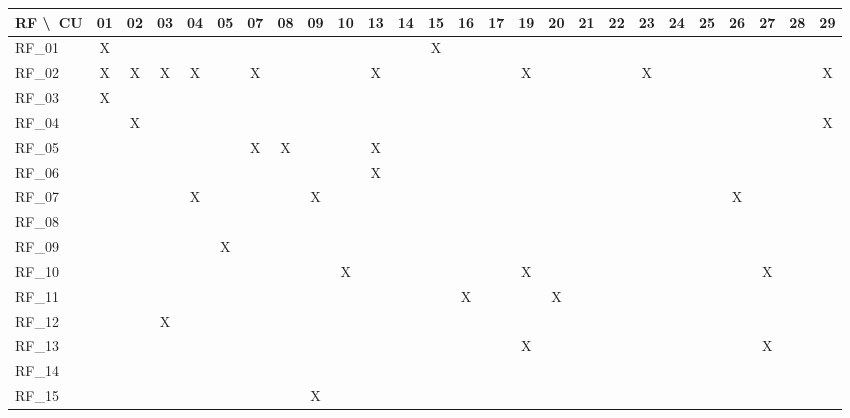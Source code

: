 \begin{landscape}
\scriptsize
\setlength{\tabcolsep}{2pt}
\renewcommand{\arraystretch}{1.1}
\begin{longtable}{|l|*{25}{c|}}
\hline
\textbf{RF \textbackslash\ CU} & \textbf{01} & \textbf{02} & \textbf{03} & \textbf{04} & \textbf{05} & \textbf{07} & \textbf{08} & \textbf{09} & \textbf{10} & \textbf{13} & \textbf{14} & \textbf{15} & \textbf{16} & \textbf{17} & \textbf{19} & \textbf{20} & \textbf{21} & \textbf{22} & \textbf{23} & \textbf{24} & \textbf{25} & \textbf{26} & \textbf{27} & \textbf{28} & \textbf{29}\\\hline
RF\_01 & X &  &  &  &  &  &  &  &  &  &  & X &  &  &  &  &  &  &  &  &  &  &  &  &  \\\hline
RF\_02 & X & X & X & X &  & X &  &  &  & X &  &  &  &  & X &  &  &  & X &  &  &  &  &  & X \\\hline
RF\_03 & X &  &  &  &  &  &  &  &  &  &  &  &  &  &  &  &  &  &  &  &  &  &  &  &  \\\hline
RF\_04 &  & X &  &  &  &  &  &  &  &  &  &  &  &  &  &  &  &  &  &  &  &  &  &  & X \\\hline
RF\_05 &  &  &  &  &  & X & X &  &  & X &  &  &  &  &  &  &  &  &  &  &  &  &  &  &  \\\hline
RF\_06 &  &  &  &  &  &  &  &  &  & X &  &  &  &  &  &  &  &  &  &  &  &  &  &  &  \\\hline
RF\_07 &  &  &  & X &  &  &  & X &  &  &  &  &  &  &  &  &  &  &  &  &  & X &  &  &  \\\hline
RF\_08 &  &  &  &  &  &  &  &  &  &  &  &  &  &  &  &  &  &  &  &  &  &  &  &  &  \\\hline
RF\_09 &  &  &  &  & X &  &  &  &  &  &  &  &  &  &  &  &  &  &  &  &  &  &  &  &  \\\hline
RF\_10 &  &  &  &  &  &  &  &  & X &  &  &  &  &  & X &  &  &  &  &  &  &  & X &  &  \\\hline
RF\_11 &  &  &  &  &  &  &  &  &  &  &  &  & X &  &  & X &  &  &  &  &  &  &  &  &  \\\hline
RF\_12 &  &  & X &  &  &  &  &  &  &  &  &  &  &  &  &  &  &  &  &  &  &  &  &  &  \\\hline
RF\_13 &  &  &  &  &  &  &  &  &  &  &  &  &  &  & X &  &  &  &  &  &  &  & X &  &  \\\hline
RF\_14 &  &  &  &  &  &  &  &  &  &  &  &  &  &  &  &  &  &  &  &  &  &  &  &  &  \\\hline
RF\_15 &  &  &  &  &  &  &  & X &  &  &  &  &  &  &  &  &  &  &  &  &  &  &  &  &  \\\hline

\end{longtable}
\end{landscape}
